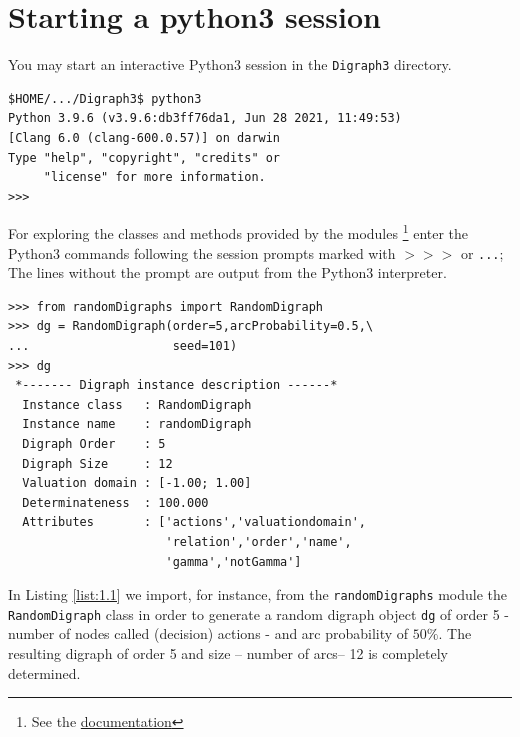 \section{Starting a \Digraph python3 session}
\label{sec:1.2}
You may start an interactive Python3 session in the \texttt{Digraph3} directory.
\begin{footnotesize}
\begin{verbatim}
$HOME/.../Digraph3$ python3
Python 3.9.6 (v3.9.6:db3ff76da1, Jun 28 2021, 11:49:53) 
[Clang 6.0 (clang-600.0.57)] on darwin
Type "help", "copyright", "credits" or 
     "license" for more information.
>>>
\end{verbatim}
\end{footnotesize}
For exploring the classes and methods provided by the \Digraph modules \footnote{See the \href{https://digraph3.readthedocs.io/en/latest/}{\Digraph documentation}} enter the Python3 commands following the session prompts marked with $>>>$ or \texttt{...}; The lines without the prompt are output from the Python3 interpreter.
\begin{lstlisting}[caption={Generating a digraph instance},label=list:1.1]
>>> from randomDigraphs import RandomDigraph
>>> dg = RandomDigraph(order=5,arcProbability=0.5,\
...                    seed=101)
>>> dg
 *------- Digraph instance description ------*
  Instance class   : RandomDigraph
  Instance name    : randomDigraph
  Digraph Order    : 5
  Digraph Size     : 12
  Valuation domain : [-1.00; 1.00]
  Determinateness  : 100.000
  Attributes       : ['actions','valuationdomain',
                      'relation','order','name',
                      'gamma','notGamma']
\end{lstlisting}
In Listing \ref{list:1.1}  we import, for instance, from the \texttt{randomDigraphs} module the \texttt{RandomDigraph} class  in order to generate a random digraph object \texttt{dg} of order 5 - number of nodes called (decision) actions - and arc probability of $50\%$. The resulting digraph of order 5 and size -- number of arcs-- 12 is completely determined.

